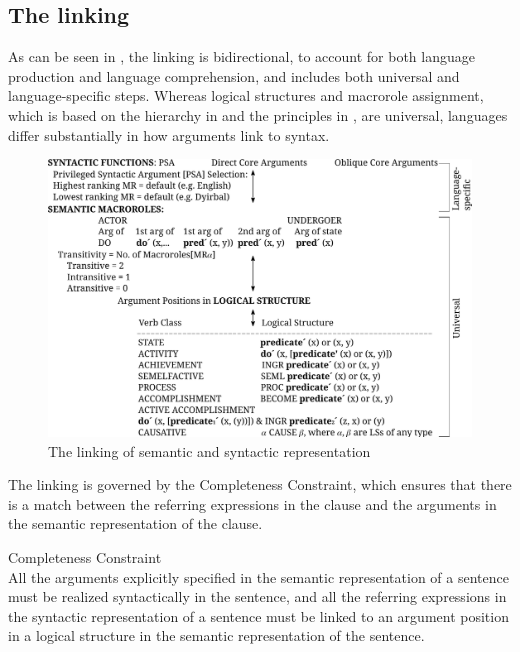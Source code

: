 \documentclass[output=paper,hidelinks]{langscibook}
\begin{document}
\subsection{The linking}
\label{sec:RRG:2.4}

As can be seen in , the linking is bidirectional, to account for both language production and language comprehension, and includes both universal and language-specific steps. Whereas logical structures and macrorole assignment, which is based on the hierarchy in  and the principles in , are universal, languages differ substantially in how arguments link to syntax.

\begin{figure}
  \includegraphics[width=\textwidth]{figures/RRG/Picture2-new.pdf}
\caption{The linking of semantic and syntactic representation \citep[177]{VanValin1997}}
\label{fig:RRG:4}
\end{figure}

The linking is governed by the Completeness Constraint, which ensures that there is a match between the referring expressions in the clause and the arguments in the semantic representation of the clause.

\ea%
   \label{ex:RRG:22} Completeness Constraint\\
   All the arguments explicitly specified in the semantic representation of a sentence must be realized syntactically in the sentence, and all the referring expressions in the syntactic representation of a sentence must be linked to an argument position in a logical structure in the semantic representation of the sentence.
   \z
\end{document}
